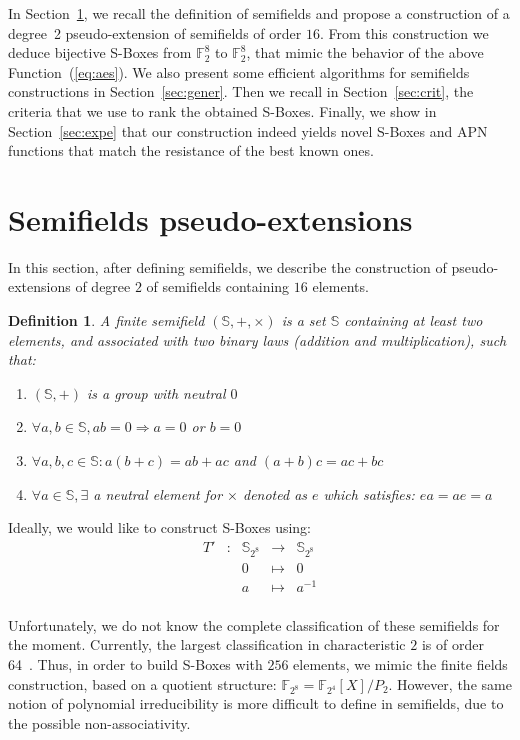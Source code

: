 \documentclass{article}\usepackage{amsthm}
\newtheorem{mydef}{Definition}
\newcommand{\F}{{\mathbb F}}
\newcommand{\SBoxes}{S-Boxes\xspace}
\begin{document}
In Section~\ref{sec:exten}, we recall the definition of semifields and propose a
construction of a degree~2 pseudo-extension of semifields of order $16$. 
From this construction we deduce bijective \SBoxes from $\F_2^8$ to $\F_2^8$, that mimic
the behavior of the above Function~(\ref{eq:aes}). 
We also present some efficient algorithms for semifields constructions in
Section~\ref{sec:gener}. 
Then we recall in Section~\ref{sec:crit}, the criteria that we use to rank the
obtained \SBoxes.
Finally, we show in Section~\ref{sec:expe} that our construction indeed yields
novel \SBoxes and APN functions that match the resistance of the best known ones.

\section{Semifields pseudo-extensions}\label{sec:exten}
In this section, after defining semifields, we describe the construction of
pseudo-extensions of degree $2$ of semifields containing $16$ elements. 

\begin{mydef}
A finite semifield $(\mathbb{S},+,\times)$ is a set $\mathbb{S}$ containing at least two elements, and associated with two binary laws (addition and multiplication), such that: 
\begin{enumerate}
	\item $(\mathbb{S}, +)$ is a group with neutral $0$
	\item $\forall a,b \in \mathbb{S}, ab=0 \Rightarrow a=0$ or $b=0$
	\item $\forall a,b,c \in \mathbb{S} : a(b+c)=ab+ac$ and $(a+b)c = ac+bc$
	\item $\forall a \in \mathbb{S}, \exists$ a neutral element for $\times$ denoted as $e$ which satisfies: $ea=ae=a$ \\
\end{enumerate}
\end{mydef}

Ideally, we would like to construct \SBoxes using:
$$\begin{array}{ccccc}
	T' & : & \mathbb{S}_{2^8} & \to & \mathbb{S}_{2^8} \\
	& & 0 & \mapsto & 0 \\
	& & a & \mapsto & a^{-1} \\
\end{array}$$

Unfortunately, we do not know the complete classification of these semifields for the moment. Currently, the 
largest classification in characteristic $2$ is of order 64~\cite{Rua:2009:classification_sf}.
Thus, in order to build \SBoxes with $256$ elements, we mimic the finite fields construction, based on a quotient structure: $\mathbb{F}_{2^8} = \mathbb{F}_{2^4}[X]/P_2$. 
However, the same notion of polynomial irreducibility is more difficult to
define in semifields, due to the possible non-associativity.
\end{document}
